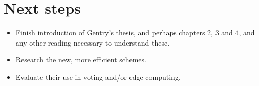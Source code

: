 \documentclass{article}
\begin{document}
\section{Next steps}

\begin{itemize}
    \item Finish introduction of Gentry's thesis, and perhaps chapters 2, 3 and 4, and any other reading necessary to understand these.
    \item Research the new, more efficient schemes.
    \item Evaluate their use in voting and/or edge computing.
\end{itemize}
\end{document}
